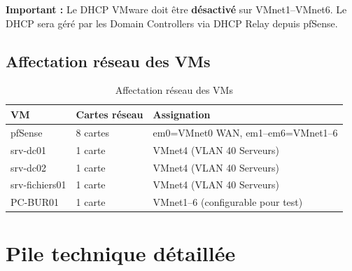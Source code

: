 \textbf{Important :} Le DHCP VMware doit être \textbf{désactivé} sur VMnet1–VMnet6. Le DHCP sera géré par les Domain Controllers via DHCP Relay depuis pfSense.

\subsection{Affectation réseau des VMs}

\begin{table}[H]
    \centering
    \begin{tabularx}{\textwidth}{|l|l|p{3cm}|}
        \hline
        \textbf{VM} & \textbf{Cartes réseau} & \textbf{Assignation} \\
        \hline
        pfSense & 8 cartes & em0=VMnet0 WAN, em1–em6=VMnet1–6 \\
        \hline
        srv-dc01 & 1 carte & VMnet4 (VLAN 40 Serveurs) \\
        \hline
        srv-dc02 & 1 carte & VMnet4 (VLAN 40 Serveurs) \\
        \hline
        srv-fichiers01 & 1 carte & VMnet4 (VLAN 40 Serveurs) \\
        \hline
        PC-BUR01 & 1 carte & VMnet1–6 (configurable pour test) \\
        \hline
    \end{tabularx}
    \caption{Affectation réseau des VMs}
    \label{tab:vm-network}
\end{table}

\section{Pile technique détaillée}

